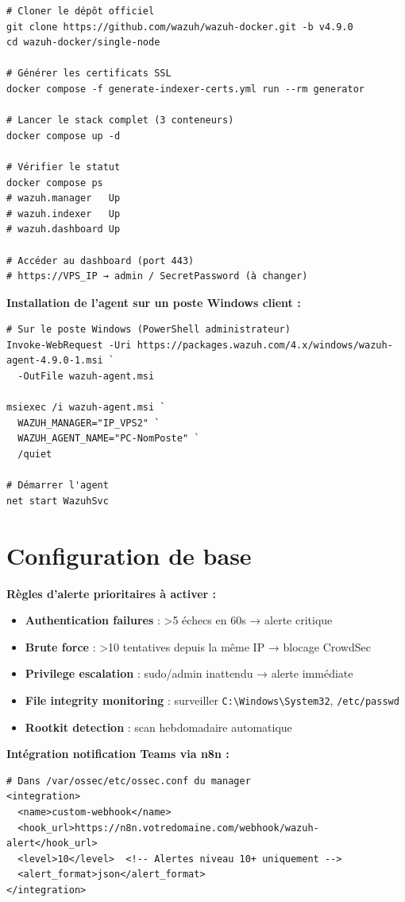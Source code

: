 \documentclass[11pt, a4paper]{article}
\begin{document}
\begin{lstlisting}[style=terminal, caption={Déploiement Wazuh via Docker officiel}]
# Cloner le dépôt officiel
git clone https://github.com/wazuh/wazuh-docker.git -b v4.9.0
cd wazuh-docker/single-node

# Générer les certificats SSL
docker compose -f generate-indexer-certs.yml run --rm generator

# Lancer le stack complet (3 conteneurs)
docker compose up -d

# Vérifier le statut
docker compose ps
# wazuh.manager   Up
# wazuh.indexer   Up
# wazuh.dashboard Up

# Accéder au dashboard (port 443)
# https://VPS_IP → admin / SecretPassword (à changer)
\end{lstlisting}

\textbf{Installation de l'agent sur un poste Windows client :}
\begin{lstlisting}[style=terminal]
# Sur le poste Windows (PowerShell administrateur)
Invoke-WebRequest -Uri https://packages.wazuh.com/4.x/windows/wazuh-agent-4.9.0-1.msi `
  -OutFile wazuh-agent.msi

msiexec /i wazuh-agent.msi `
  WAZUH_MANAGER="IP_VPS2" `
  WAZUH_AGENT_NAME="PC-NomPoste" `
  /quiet

# Démarrer l'agent
net start WazuhSvc
\end{lstlisting}

\section{Configuration de base}

\textbf{Règles d'alerte prioritaires à activer :}
\begin{itemize}
  \item \textbf{Authentication failures} : >5 échecs en 60s → alerte critique
  \item \textbf{Brute force} : >10 tentatives depuis la même IP → blocage CrowdSec
  \item \textbf{Privilege escalation} : sudo/admin inattendu → alerte immédiate
  \item \textbf{File integrity monitoring} : surveiller \texttt{C:\textbackslash Windows\textbackslash System32}, \texttt{/etc/passwd}
  \item \textbf{Rootkit detection} : scan hebdomadaire automatique
\end{itemize}

\textbf{Intégration notification Teams via n8n :}
\begin{lstlisting}[style=yamlstyle, caption={Webhook Wazuh → n8n (ossec.conf)}]
# Dans /var/ossec/etc/ossec.conf du manager
<integration>
  <name>custom-webhook</name>
  <hook_url>https://n8n.votredomaine.com/webhook/wazuh-alert</hook_url>
  <level>10</level>  <!-- Alertes niveau 10+ uniquement -->
  <alert_format>json</alert_format>
</integration>
\end{lstlisting}
\end{document}
